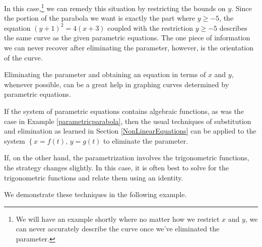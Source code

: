 \documentclass{ximera}
\begin{document}
\smallskip

In this case,\footnote{We will have an example shortly where no matter how we restrict $x$ and $y$, we can never accurately describe the curve once we've eliminated the parameter.} we can remedy this situation by restricting the bounds on $y$.  Since the portion of the parabola we want is exactly the part where $y \geq -5$, the equation $(y+1)^2 = 4(x+3)$ coupled with the restriction $y \geq -5$ describes the same curve as the given parametric equations.  The one piece of information we can never recover after eliminating the parameter, however,  is the orientation of the curve.

\smallskip

Eliminating the parameter and obtaining an equation in terms of $x$ and $y$, whenever possible, can be a great help in graphing curves determined by parametric equations.

\smallskip

 If the system of parametric equations contains algebraic functions, as was the case in  Example \ref{parametricparabola}, then the usual techniques of substitution and elimination as learned  in Section \ref{NonLinearEquations} can be applied to the system $\left\{ x = f(t), \, y = g(t) \right.$ to eliminate the parameter.  
 
 \smallskip
 
 If, on the other hand, the parametrization involves the trigonometric functions, the strategy changes slightly.  In this case, it is often best to solve for the trigonometric functions and relate them using an identity.  
 
 \smallskip
 
 We demonstrate these techniques in the following example.
\end{document}
